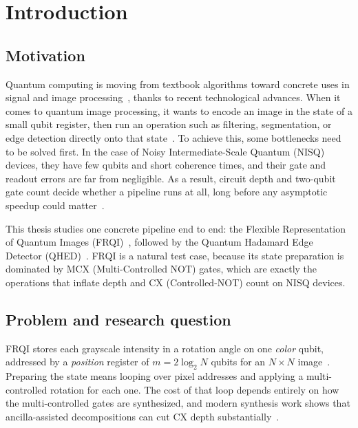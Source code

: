 \chapter{Introduction}\label{ch:introduction}
\thispagestyle{pagestyle}

\section{Motivation}
Quantum computing is moving from textbook algorithms toward concrete uses in signal and image processing~\cite{Ruan2021OpportunitiesChallenges,Wang2022ReviewQIP,Farooq2025SystematicReview}, thanks to recent technological advances. When it comes to quantum image processing, it wants to encode an image in the state of a small qubit register, then run an operation such as filtering, segmentation, or edge detection directly onto that state~\cite{Le2011FRQI,Yao2017QHED}. To achieve this, some bottlenecks need to be solved first. In the case of Noisy Intermediate-Scale Quantum (NISQ) devices, they have few qubits and short coherence times, and their gate and readout errors are far from negligible. As a result, circuit depth and two-qubit gate count decide whether a pipeline runs at all, long before any asymptotic speedup could matter~\cite{Preskill2018NISQ,Geng2022HybridNISQEdge,Geng2023ImprovedFRQI}.

This thesis studies one concrete pipeline end to end: the Flexible Representation of Quantum Images (FRQI)~\cite{Le2011FRQI}, followed by the Quantum Hadamard Edge Detector (QHED)~\cite{Yao2017QHED,QiskitTextbookQuantumEdgeDetection}. FRQI is a natural test case, because its state preparation is dominated by MCX (Multi-Controlled NOT) gates, which are exactly the operations that inflate depth and CX (Controlled-NOT) count on NISQ devices.

\section{Problem and research question}
FRQI stores each grayscale intensity in a rotation angle on one \emph{color} qubit, addressed by a \emph{position} register of $m = 2\log_2 N$ qubits for an $N\times N$ image~\cite{Le2011FRQI,Iliyasu2013FRQIroadmap}. Preparing the state means looping over pixel addresses and applying a multi-controlled rotation for each one. The cost of that loop depends entirely on how the multi-controlled gates are synthesized, and modern synthesis work shows that ancilla-assisted decompositions can cut CX depth substantially~\cite{Vale2023MCSU2,Azevedo2024LowDepthMCG,Arsoski2024MCXQFT,Zindorf2024EfficientMCG}.

